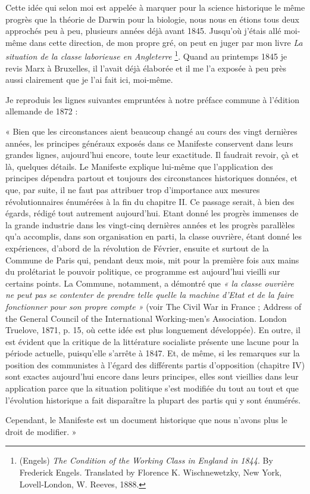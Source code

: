 \documentclass[french,twoside]{book} %
\newenvironment{quoteblock}%
  {\begin{quoting}}
  {\end{quoting}}
\newenvironment{quotebar}{%
    \def\FrameCommand{{\color{rubric!10!}\vrule width 0.5em} \hspace{0.9em}}%
    \def\OuterFrameSep{\itemsep} %
    \MakeFramed {\advance\hsize-\width \FrameRestore}
  }%
  {%
    \endMakeFramed
  }
\renewenvironment{quoteblock}%
  {%
    \savenotes
    \setstretch{0.9}
    \begin{quotebar}
  }
  {%
    \end{quotebar}
    \spewnotes
  }
\begin{document}
Cette idée qui selon moi est appelée à marquer pour la science historique le même progrès que la théorie de Darwin pour la biologie, nous nous en étions tous deux approchés peu à peu, plusieurs années déjà avant 1845. Jusqu’où j’étais allé moi-même dans cette direction, de mon propre gré, on peut en juger par mon livre \emph{La situation de la classe laborieuse en Angleterre} \footnote{(Engels) \emph{The Condition of the Working Class in England in 1844}. By Frederick Engels. Translated by Florence K. Wischnewetzky, New York, Lovell-London, W. Reeves, 1888.}. Quand au printemps 1845 je revis Marx à Bruxelles, il l’avait déjà élaborée et il me l’a exposée à peu près aussi clairement que je l’ai fait ici, moi-même.\par
Je reproduis les lignes suivantes empruntées à notre préface commune à l’édition allemande de 1872 :\par

\begin{quoteblock}
\noindent « Bien que les circonstances aient beaucoup changé au cours des vingt dernières années, les principes généraux exposés dans ce Manifeste conservent dans leurs grandes lignes, aujourd’hui encore, toute leur exactitude. Il faudrait revoir, çà et là, quelques détails. Le Manifeste explique lui-même que l’application des principes dépendra partout et toujours des circonstances historiques données, et que, par suite, il ne faut pas attribuer trop d’importance aux mesures révolutionnaires énumérées à la fin du chapitre II. Ce passage serait, à bien des égards, rédigé tout autrement aujourd’hui. Etant donné les progrès immenses de la grande industrie dans les vingt-cinq dernières années et les progrès parallèles qu’a accomplis, dans son organisation en parti, la classe ouvrière, étant donné les expériences, d’abord de la révolution de Février, ensuite et surtout de la Commune de Paris qui, pendant deux mois, mit pour la première fois aux mains du prolétariat le pouvoir politique, ce programme est aujourd’hui vieilli sur certains points. La Commune, notamment, a démontré que \emph{« la classe ouvrière ne peut pas se contenter de prendre telle quelle la machine d’Etat et de la faire fonctionner pour son propre compte »} (voir The Civil War in France ; Address of the General Council of the International Working-men’s Association. London Truelove, 1871, p. 15, où cette idée est plus longuement développée). En outre, il est évident que la critique de la littérature socialiste présente une lacune pour la période actuelle, puisqu’elle s’arrête à 1847. Et, de même, si les remarques sur la position des communistes à l’égard des différents partis d’opposition (chapitre IV) sont exactes aujourd’hui encore dans leurs principes, elles sont vieillies dans leur application parce que la situation politique s’est modifiée du tout au tout et que l’évolution historique a fait disparaître la plupart des partis qui y sont énumérés.\par
Cependant, le Manifeste est un document historique que nous n’avons plus le droit de modifier. »
\end{quoteblock}
\end{document}

